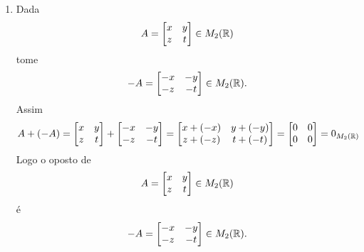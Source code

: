 \documentclass[12pt]{exam}
\begin{document}
\begin{enumerate}[label={\roman*})]
    \item Dada
    \[
        A = \begin{bmatrix}
        x & y\\
        z & t
    \end{bmatrix} \in M_2(\mathbb{R})
    \]
    tome
    \[
        -A = \begin{bmatrix}
        -x & -y\\
        -z & -t
    \end{bmatrix} \in M_2(\mathbb{R}).
    \]
    Assim
    \begin{align*}
      A + (-A) = \begin{bmatrix}
        x & y\\
        z & t
    \end{bmatrix} + \begin{bmatrix}
        -x & -y\\
        -z & -t
    \end{bmatrix} = \begin{bmatrix}
        x + (-x) & y + (-y)\\
        z + (-z)& t + (-t)
    \end{bmatrix} = \begin{bmatrix}
        0 & 0\\
        0 & 0
    \end{bmatrix} = 0_{M_2(\mathbb{R})}
    \end{align*}
    Logo o oposto de
    \[
        A = \begin{bmatrix}
        x & y\\
        z & t
    \end{bmatrix} \in M_2(\mathbb{R})
    \] \'e
    \[
        -A = \begin{bmatrix}
        -x & -y\\
        -z & -t
    \end{bmatrix} \in M_2(\mathbb{R}).
    \]


\end{enumerate}
\end{document}

